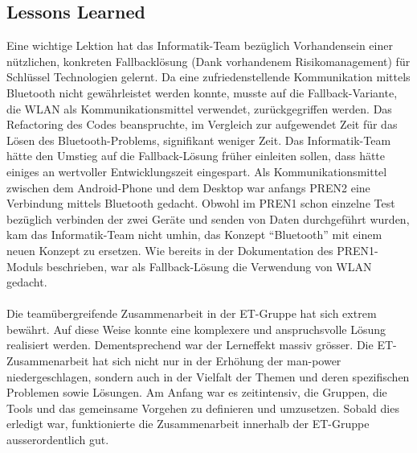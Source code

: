 \subsection{Lessons Learned}
Eine wichtige Lektion hat das Informatik-Team bezüglich Vorhandensein einer nützlichen, 
konkreten Fallbacklösung (Dank vorhandenem Risikomanagement) für Schlüssel Technologien gelernt. 
Da eine zufriedenstellende Kommunikation mittels Bluetooth nicht gewährleistet werden konnte, 
musste auf die Fallback-Variante, die WLAN als Kommunikationsmittel verwendet, zurückgegriffen werden. 
Das Refactoring des Codes beanspruchte, im Vergleich zur aufgewendet Zeit für das Lösen des Bluetooth-Problems, 
signifikant weniger Zeit. Das Informatik-Team hätte den Umstieg auf die Fallback-Lösung früher einleiten sollen, 
dass hätte einiges an wertvoller Entwicklungszeit eingespart.
\newline
\newline
Als Kommunikationsmittel zwischen dem Android-Phone und dem Desktop war anfangs PREN2 eine Verbindung 
mittels Bluetooth gedacht. Obwohl im PREN1 schon einzelne Test bezüglich verbinden der zwei Geräte und 
senden von Daten durchgeführt wurden, kam das Informatik-Team nicht umhin, das Konzept \enquote{Bluetooth} mit einem neuen 
Konzept zu ersetzen. Wie bereits in der Dokumentation des PREN1-Moduls beschrieben, war als Fallback-Lösung 
die Verwendung von WLAN gedacht. 
\\
\\
Die teamübergreifende Zusammenarbeit in der ET-Gruppe hat sich extrem bewährt.  Auf diese Weise 
konnte eine komplexere und anspruchsvolle Lösung realisiert werden. Dementsprechend war der 
Lerneffekt massiv grösser. Die ET-Zusammenarbeit hat sich nicht nur in der Erhöhung der man-power 
niedergeschlagen, sondern auch in der Vielfalt der Themen und deren spezifischen Problemen sowie 
Lösungen. Am Anfang war es zeitintensiv, die Gruppen, die Tools und das gemeinsame Vorgehen zu 
definieren und umzusetzen. Sobald dies erledigt war, funktionierte die Zusammenarbeit innerhalb 
der ET-Gruppe ausserordentlich gut.
